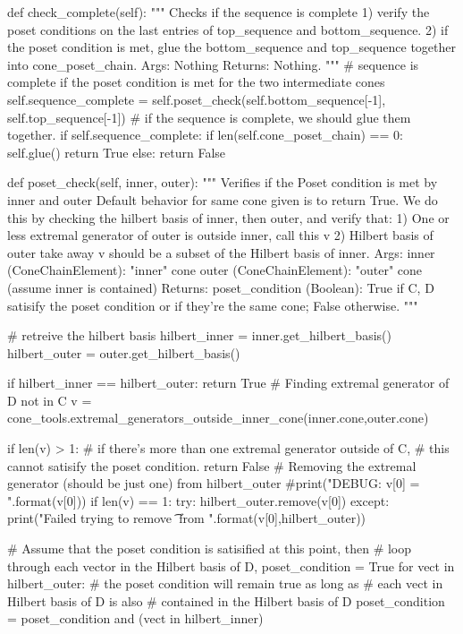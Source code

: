\documentclass{TC}
\begin{document}
\begin{SAGE}
	def check_complete(self):
		""" Checks if the sequence is complete 
		1) verify the poset conditions on the last entries of
			top_sequence and bottom_sequence.
		2) if the poset condition is met, glue the bottom_sequence and 
			top_sequence together into cone_poset_chain.
		Args: Nothing
		Returns: Nothing.
		"""	
		# sequence is complete if the poset condition is met for the two intermediate cones
		self.sequence_complete = self.poset_check(self.bottom_sequence[-1],
														self.top_sequence[-1])
		# if the sequence is complete, we should glue them together.
		if self.sequence_complete:
			if len(self.cone_poset_chain) == 0:
				self.glue()
			return True
		else:
			return False
		
	def poset_check(self, inner, outer):
		""" Verifies if the Poset condition is met by inner and outer
		Default behavior for same cone given is to return True.
		We do this by checking the hilbert basis of inner, then outer,
		and verify that:
			1) One or less extremal generator of outer is outside inner, call this v
			2) Hilbert basis of outer take away v should be a subset of
				the Hilbert basis of inner.
		Args: 
			inner (ConeChainElement): "inner" cone
			outer (ConeChainElement): "outer" cone (assume inner is contained)
		Returns: 
			poset_condition (Boolean): 	True if C, D satisify the poset condition
					or if they're the same cone;
				False otherwise.
		"""

		# retreive the hilbert basis 
		hilbert_inner = inner.get_hilbert_basis()
		hilbert_outer = outer.get_hilbert_basis()

		
		if hilbert_inner == hilbert_outer:
			return True
		# Finding extremal generator of D not in C
		v = cone_tools.extremal_generators_outside_inner_cone(inner.cone,outer.cone)

		if len(v) > 1:
			# if there's more than one extremal generator outside of C, 
			# this cannot satisify the poset condition.
			return False
		# Removing the extremal generator (should be just one) from hilbert_outer
		#print("DEBUG: v[0] = {}".format(v[0]))
		if len(v) == 1:
			try:
				hilbert_outer.remove(v[0])
			except:
				print("Failed trying to remove \n\t{} from \n{}".format(v[0],hilbert_outer))

		# Assume that the poset condition is satisified at this point, then
		# loop through each vector in the Hilbert basis of D, 
			poset_condition = True
			for vect in hilbert_outer:
				# the poset condition will remain true as long as 
				# each vect in Hilbert basis of D is also
				# contained in the Hilbert basis of D
				poset_condition = poset_condition and (vect in hilbert_inner) 
			

\end{SAGE}
\end{document}
